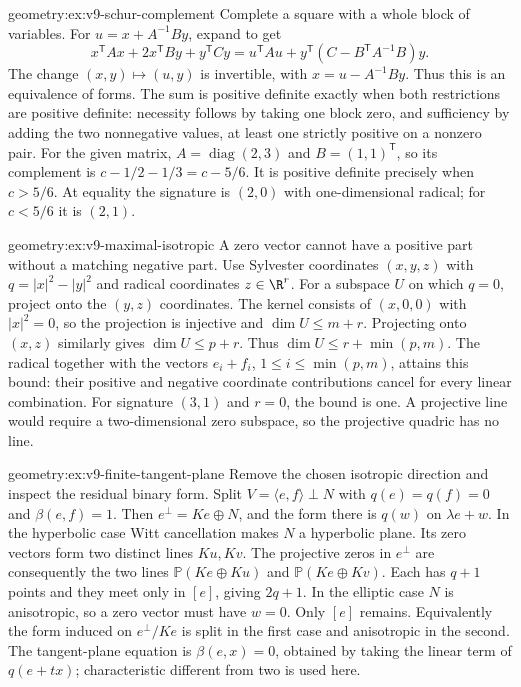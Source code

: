 \begin{solution}{geometry:ex:v9-schur-complement}
\idea Complete a square with a whole block of variables.
\writeup For $u=x+A^{-1}By$, expand to get
\[
 x^{\mathsf T}Ax+2x^{\mathsf T}By+y^{\mathsf T}Cy
 =u^{\mathsf T}Au+y^{\mathsf T}(C-B^{\mathsf T}A^{-1}B)y.
\]
The change $(x,y)\mapsto(u,y)$ is invertible, with
$x=u-A^{-1}By$. Thus this is an equivalence of forms.
The sum is positive definite exactly when both restrictions are positive
definite: necessity follows by taking one block zero, and sufficiency
by adding the two nonnegative values, at least one strictly positive
on a nonzero pair. For the given matrix, $A=\operatorname{diag}(2,3)$
and $B=(1,1)^{\mathsf T}$, so its complement is
$c-1/2-1/3=c-5/6$. It is positive definite precisely when $c>5/6$.
At equality the signature is $(2,0)$ with one-dimensional radical;
for $c<5/6$ it is $(2,1)$.
\end{solution}
\begin{solution}{geometry:ex:v9-maximal-isotropic}
\idea A zero vector cannot have a positive part without a matching negative part.
\writeup Use Sylvester coordinates $(x,y,z)$ with
$q=|x|^2-|y|^2$ and radical coordinates $z\in\R^r$.
For a subspace $U$ on which $q=0$, project onto the $(y,z)$ coordinates.
The kernel consists of $(x,0,0)$ with $|x|^2=0$, so the projection is
injective and $\dim U\le m+r$. Projecting onto $(x,z)$ similarly gives
$\dim U\le p+r$. Thus $\dim U\le r+\min(p,m)$.
The radical together with the vectors $e_i+f_i$, $1\le i\le\min(p,m)$,
attains this bound: their positive and negative coordinate contributions
cancel for every linear combination.
For signature $(3,1)$ and $r=0$, the bound is one.
A projective line would require a two-dimensional zero subspace,
so the projective quadric has no line.
\end{solution}
\begin{solution}{geometry:ex:v9-finite-tangent-plane}
\idea Remove the chosen isotropic direction and inspect the residual binary form.
\writeup Split $V=\langle e,f\rangle\perp N$ with
$q(e)=q(f)=0$ and $\beta(e,f)=1$.
Then $e^\perp=Ke\oplus N$, and the form there is $q(w)$ on
$\lambda e+w$. In the hyperbolic case Witt cancellation makes $N$
a hyperbolic plane. Its zero vectors form two distinct lines $Ku,Kv$.
The projective zeros in $e^\perp$ are consequently the two lines
$\mathbb P(Ke\oplus Ku)$ and $\mathbb P(Ke\oplus Kv)$.
Each has $q+1$ points and they meet only in $[e]$, giving $2q+1$.
In the elliptic case $N$ is anisotropic, so a zero vector must have
$w=0$. Only $[e]$ remains. Equivalently the form induced on
$e^\perp/Ke$ is split in the first case and anisotropic in the second.
The tangent-plane equation is $\beta(e,x)=0$, obtained by taking the
linear term of $q(e+tx)$; characteristic different from two is used here.
\end{solution}
